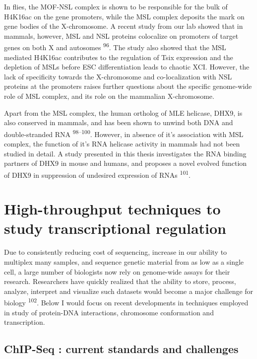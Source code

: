 \documentclass[11pt,twoside]{MPIthesis}
\theoremstyle{definition}
\theoremstyle{definition}
\theoremstyle{definition}
\theoremstyle{remark}
\begin{document}
In flies, the MOF-NSL complex is shown to be responsible for the bulk of
H4K16ac on the gene promoters, while the MSL complex deposits the mark
on gene bodies of the X-chromosome. A recent study from our lab showed
that in mammals, however, MSL and NSL proteins colocalize on promoters
of target genes on both X and autosomes \textsuperscript{96}. The study
also showed that the MSL mediated H4K16ac contributes to the regulation
of Tsix expression and the depletion of MSLs before ESC differentiation
leads to chaotic XCI. However, the lack of specificity towards the
X-chromosome and co-localization with NSL proteins at the promoters
raises further questions about the specific genome-wide role of MSL
complex, and its role on the mammalian X-chromosome.

Apart from the MSL complex, the human ortholog of MLE helicase, DHX9, is
also conserved in mammals, and has been shown to unwind both DNA and
double-stranded RNA \textsuperscript{98--100}. However, in absence of
it's association with MSL complex, the function of it's RNA helicase
activity in mammals had not been studied in detail. A study presented in
this thesis investigates the RNA binding partners of DHX9 in mouse and
humans, and proposes a novel evolved function of DHX9 in suppression of
undesired expression of RNAs \textsuperscript{101}.

\section{High-throughput techniques to study transcriptional
regulation}\label{high-throughput-techniques-to-study-transcriptional-regulation}

Due to consistently reducing cost of sequencing, increase in our ability
to multiplex many samples, and sequence genetic material from as low as
a single cell, a large number of biologists now rely on genome-wide
assays for their research. Researchers have quickly realized that the
ability to store, process, analyze, interpret and visualize such
datasets would become a major challenge for biology
\textsuperscript{102}. Below I would focus on recent developments in
techniques employed in study of protein-DNA interactions, chromosome
conformation and transcription.

\subsection{ChIP-Seq : current standards and
challenges}\label{chip-seq-current-standards-and-challenges}
\end{document}
